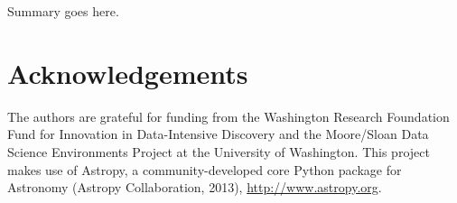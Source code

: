 \documentclass{emulateapj}
\begin{document}
Summary goes here.


\section*{Acknowledgements}
The authors are grateful for funding from the Washington Research Foundation Fund for Innovation in Data-Intensive Discovery and the Moore/Sloan Data Science Environments Project at the University of Washington. This project makes use of Astropy, a community-developed core Python package for Astronomy (Astropy Collaboration, 2013), \url{http://www.astropy.org}.




\end{document}
